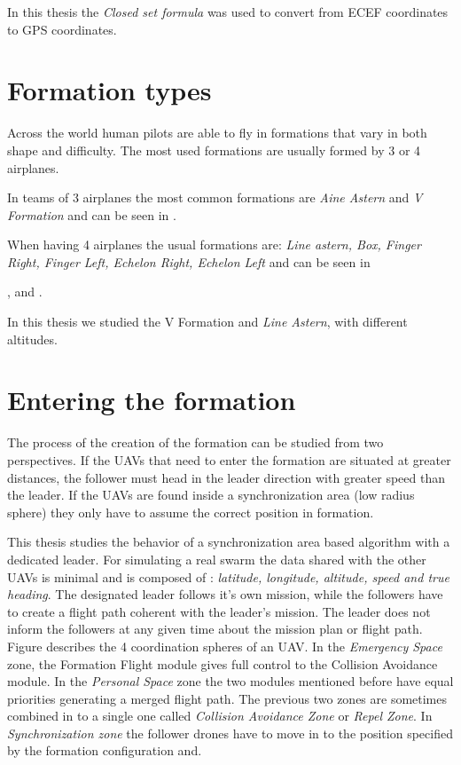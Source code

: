 In this thesis the \textit{Closed set formula} was used to convert from ECEF
coordinates to GPS coordinates.

\section{Formation types}
\label{sec::formation-types}
Across the world human pilots are able to fly in formations that vary in both
shape and difficulty. The most used formations are usually formed by 3 
or 4 airplanes. 

In teams of 3 airplanes the most common formations are \textit{Aine Astern} and
\textit{V Formation} and can be seen in .
% 
\newpage

When having 4 airplanes the usual formations are: \textit{Line astern,  Box, 
Finger Right, Finger Left,  Echelon Right, Echelon Left} and can be seen in

,   and
.
\newpage

In this thesis we studied the {V Formation} and \textit{Line Astern}, with different
altitudes.

\section{Entering the formation}
\label{sec:formation-entering}
The process of the creation of the formation can be studied from two perspectives. If the UAVs
that need to enter the formation are situated at greater distances, the follower
must head in the leader direction with greater speed than the leader. If the 
UAVs are found inside a synchronization area (low radius sphere) they only have to
assume the correct position in formation. 

This thesis studies the behavior of a synchronization area based algorithm with
a dedicated leader. For simulating a real swarm the data shared with the other
UAVs is minimal and is composed of : \textit{latitude, longitude, altitude, speed 
and true heading}. The designated leader follows it's own mission, while
the followers have to create a flight path coherent with the leader's mission.
The leader does not inform the followers at any given time about the mission 
plan or flight path. Figure  describes
the 4 coordination spheres of an UAV. In the \textit{Emergency Space} zone, 
the Formation Flight module gives full control to the Collision Avoidance module.
In the \textit{Personal Space} zone the two modules mentioned before have equal
priorities generating a merged flight path. The previous two zones are sometimes
combined in to a single one called \textit{Collision Avoidance Zone} or 
\textit{Repel Zone}. In \textit{Synchronization zone} the follower drones have
to move in to the position specified by the formation configuration and.

